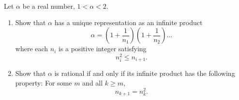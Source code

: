 \documentclass{article}
\begin{document}
\setlength{\parindent}{0pt}
Let $\alpha$ be a real number, $1<\alpha<2$.
\begin{enumerate}[label=\alph*)]
\item Show that $\alpha$ has a unique representation as an infinite product 
\[
\alpha=\left(1+\frac{1}{n_1}\right)\left(1+\frac{1}{n_2}\right)\dots
\]
where each $n_i$ is a positive integer satisfying
\[n_i^2\leq n_{i+1}.\]
\item Show that $\alpha$ is rational if and only if its infinite product has the following property:
For some $m$ and all $k\geq m$, \[
n_{k+1}=n_k^2.\]
\end{enumerate}
\end{document}
